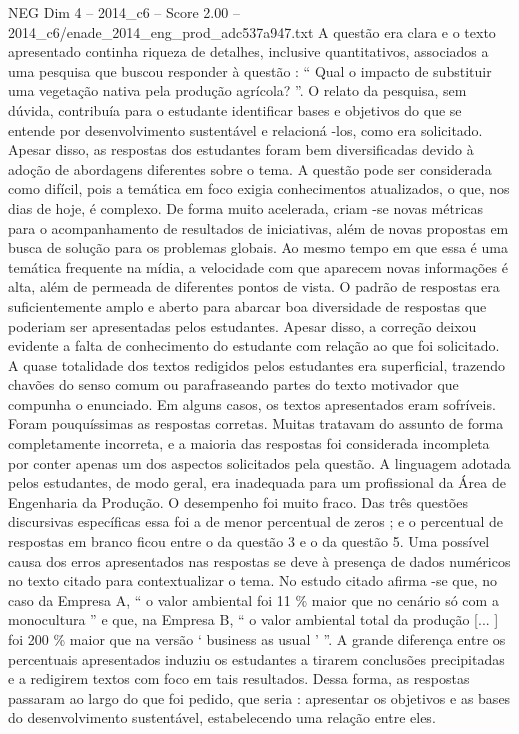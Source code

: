 \begin{textsample}{NEG Dim 4 – 2014\_c6 – Score 2.00 – 2014\_c6/enade\_2014\_eng\_prod\_adc537a947.txt}
A questão era clara e o texto apresentado continha riqueza de detalhes, inclusive quantitativos, associados a uma pesquisa que buscou responder à questão : “ Qual o impacto de substituir uma vegetação nativa pela produção agrícola? ”.
O relato da pesquisa, sem dúvida, contribuía para o estudante identificar bases e objetivos do que se entende por desenvolvimento sustentável e relacioná -los, como era solicitado.
Apesar disso, as respostas dos estudantes foram bem diversificadas devido à adoção de abordagens diferentes sobre o tema.
A questão pode ser considerada como difícil, pois a temática em foco exigia conhecimentos atualizados, o que, nos dias de hoje, é complexo.
De forma muito acelerada, criam -se novas métricas para o acompanhamento de resultados de iniciativas, além de novas propostas em busca de solução para os problemas globais.
Ao mesmo tempo em que essa é uma temática frequente na mídia, a velocidade com que aparecem novas informações é alta, além de permeada de diferentes pontos de vista.
O padrão de respostas era suficientemente amplo e aberto para abarcar boa diversidade de respostas que poderiam ser apresentadas pelos estudantes.
Apesar disso, a correção deixou evidente a falta de conhecimento do estudante com relação ao que foi solicitado.
A quase totalidade dos textos redigidos pelos estudantes era superficial, trazendo chavões do senso comum ou parafraseando partes do texto motivador que compunha o enunciado.
Em alguns casos, os textos apresentados eram sofríveis.
Foram pouquíssimas as respostas corretas.
Muitas tratavam do assunto de forma completamente incorreta, e a maioria das respostas foi considerada incompleta por conter apenas um dos aspectos solicitados pela questão.
A linguagem adotada pelos estudantes, de modo geral, era inadequada para um profissional da Área de Engenharia da Produção.
O desempenho foi muito fraco.
Das três questões discursivas específicas essa foi a de menor percentual de zeros ; e o percentual de respostas em branco ficou entre o da questão 3 e o da questão 5.
Uma possível causa dos erros apresentados nas respostas se deve à presença de dados numéricos no texto citado para contextualizar o tema.
No estudo citado afirma -se que, no caso da Empresa A, “ o valor ambiental foi 11 \% maior que no cenário só com a monocultura ” e que, na Empresa B, “ o valor ambiental total da produção [... ] foi 200 \% maior que na versão ‘ business as usual ’ ”.
A grande diferença entre os percentuais apresentados induziu os estudantes a tirarem conclusões precipitadas e a redigirem textos com foco em tais resultados.
Dessa forma, as respostas passaram ao largo do que foi pedido, que seria : apresentar os objetivos e as bases do desenvolvimento sustentável, estabelecendo uma relação entre eles.

\end{textsample}
